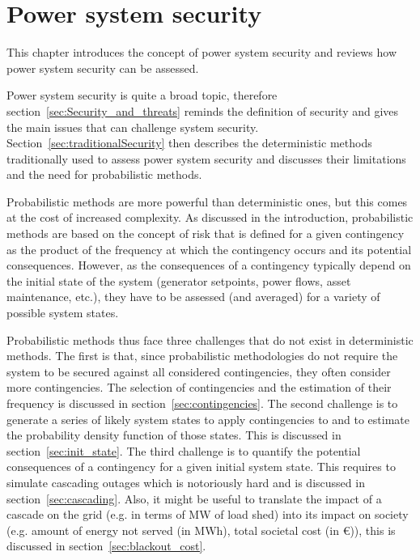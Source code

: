\chapter{Power system security}
\label{ch:security}
\adjustmtc
\adjustmtc
\minitoc

This chapter introduces the concept of power system security and reviews how power system security can be assessed.

Power system security is quite a broad topic, therefore section~\ref{sec:Security_and_threats} reminds the definition of security and gives the main issues that can challenge system security. Section~\ref{sec:traditionalSecurity} then describes the deterministic methods traditionally used to assess power system security and discusses their limitations and the need for probabilistic methods.

Probabilistic methods are more powerful than deterministic ones, but this comes at the cost of increased complexity. As discussed in the introduction, probabilistic methods are based on the concept of risk that is defined for a given contingency as the product of the frequency at which the contingency occurs and its potential consequences. However, as the consequences of a contingency typically depend on the initial state of the system (generator setpoints, power flows, asset maintenance, etc.), they have to be assessed (and averaged) for a variety of possible system states.

Probabilistic methods thus face three challenges that do not exist in deterministic methods. The first is that, since probabilistic methodologies do not require the system to be secured against all considered contingencies, they often consider more contingencies. The selection of contingencies and the estimation of their frequency is discussed in section~\ref{sec:contingencies}. The second challenge is to generate a series of likely system states to apply contingencies to and to estimate the probability density function of those states. This is discussed in section~\ref{sec:init_state}. The third challenge is to quantify the potential consequences of a contingency for a given initial system state. This requires to simulate cascading outages which is notoriously hard and is discussed in section~\ref{sec:cascading}. Also, it might be useful to translate the impact of a cascade on the grid (e.g. in terms of MW of load shed) into its impact on society (e.g. amount of energy not served (in MWh), total societal cost (in €)), this is discussed in section~\ref{sec:blackout_cost}.

